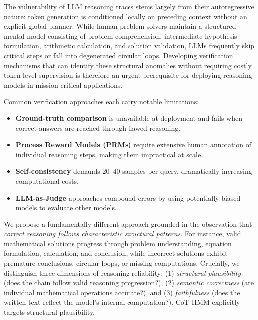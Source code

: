 \documentclass[conference]{IEEEtran}
\begin{document}
The vulnerability of LLM reasoning traces stems largely from their autoregressive nature: token generation is conditioned locally on preceding context without an explicit global planner. While human problem-solvers maintain a structured mental model consisting of problem comprehension, intermediate hypothesis formulation, arithmetic calculation, and solution validation, LLMs frequently skip critical steps or fall into degenerated circular loops. Developing verification mechanisms that can identify these structural anomalies without requiring costly token-level supervision is therefore an urgent prerequisite for deploying reasoning models in mission-critical applications.

Common verification approaches each carry notable limitations:
\begin{itemize}
    \item \textbf{Ground-truth comparison} is unavailable at deployment and fails when correct answers are reached through flawed reasoning.
    \item \textbf{Process Reward Models (PRMs)} \cite{lightman2024let} require extensive human annotation of individual reasoning steps, making them impractical at scale.
    \item \textbf{Self-consistency} \cite{wang2023self} demands 20--40 samples per query, dramatically increasing computational costs.
    \item \textbf{LLM-as-Judge} approaches compound errors by using potentially biased models to evaluate other models.
\end{itemize}

We propose a fundamentally different approach grounded in the observation that \textit{correct reasoning follows characteristic structural patterns}. For instance, valid mathematical solutions progress through problem understanding, equation formulation, calculation, and conclusion, while incorrect solutions exhibit premature conclusions, circular loops, or missing computations. Crucially, we distinguish three dimensions of reasoning reliability: (1) \textit{structural plausibility} (does the chain follow valid reasoning progression?), (2) \textit{semantic correctness} (are individual mathematical operations accurate?), and (3) \textit{faithfulness} (does the written text reflect the model's internal computation?). CoT-HMM explicitly targets structural plausibility.
\end{document}
